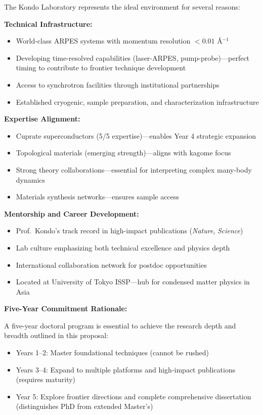\documentclass[12pt,a4paper]{article}
\begin{document}
The Kondo Laboratory represents the ideal environment for several reasons:

\textbf{Technical Infrastructure:}
\begin{itemize}
    \item World-class ARPES systems with momentum resolution $<0.01$ Å$^{-1}$
    \item Developing time-resolved capabilities (laser-ARPES, pump-probe)—perfect timing to contribute to frontier technique development
    \item Access to synchrotron facilities through institutional partnerships
    \item Established cryogenic, sample preparation, and characterization infrastructure
\end{itemize}

\textbf{Expertise Alignment:}
\begin{itemize}
    \item Cuprate superconductors (5/5 expertise)—enables Year 4 strategic expansion
    \item Topological materials (emerging strength)—aligns with kagome focus
    \item Strong theory collaborations—essential for interpreting complex many-body dynamics
    \item Materials synthesis networks—ensures sample access
\end{itemize}

\textbf{Mentorship and Career Development:}
\begin{itemize}
    \item Prof.~Kondo's track record in high-impact publications (\textit{Nature}, \textit{Science})
    \item Lab culture emphasizing both technical excellence and physics depth
    \item International collaboration network for postdoc opportunities
    \item Located at University of Tokyo ISSP—hub for condensed matter physics in Asia
\end{itemize}

\textbf{Five-Year Commitment Rationale:}

A five-year doctoral program is essential to achieve the research depth and breadth outlined in this proposal:
\begin{itemize}
    \item Years 1--2: Master foundational techniques (cannot be rushed)
    \item Years 3--4: Expand to multiple platforms and high-impact publications (requires maturity)
    \item Year 5: Explore frontier directions and complete comprehensive dissertation (distinguishes PhD from extended Master's)
\end{itemize}
\end{document}
